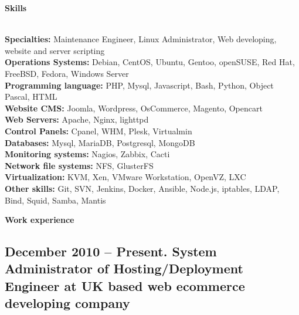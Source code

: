 \documentclass[letterpaper]{article}
\renewcommand{\section}[1]{
  {
    \large \colorbox{my-gray}{
      \begin{minipage}
        {\textwidth-0.175in}
        {\textbf{#1 \vphantom{p\^{E}}}}
      \end{minipage}
    }
  }
}
\begin{document}
\section{Skills}
\label{sec-1}\\
\label{sec-1-1}
\textbf{Specialties:} Maintenance Engineer, Linux Administrator, Web developing, website and server scripting\\
\label{sec-1-2}
\textbf{Operations Systems:} Debian, CentOS, Ubuntu, Gentoo, openSUSE, Red Hat, FreeBSD, Fedora, Windows Server\\
\label{sec-1-3}
\textbf{Programming language:} PHP, Mysql, Javascript, Bash, Python, Object Pascal, HTML\\
\label{sec-1-4}
\textbf{Website CMS:} Joomla, Wordpress, OsCommerce, Magento, Opencart\\
\label{sec-1-5}
\textbf{Web Servers:} Apache, Nginx, lighttpd\\
\label{sec-1-6}
\textbf{Control Panels:} Cpanel, WHM, Plesk, Virtualmin\\
\label{sec-1-7}
\textbf{Databases:} Mysql, MariaDB, Postgresql, MongoDB\\
\label{sec-1-8}
\textbf{Monitoring systems:} Nagios, Zabbix, Cacti\\
\label{sec-1-9}
\textbf{Network file systems:} NFS, GlusterFS\\
\label{sec-1-10}
\textbf{Virtualization:} KVM, Xen, VMware Workstation, OpenVZ, LXC\\
\label{sec-1-11}
\textbf{Other skills:} Git, SVN, Jenkins, Docker, Ansible, Node.js, iptables, LDAP, Bind, Squid, Samba, Mantis\\
\section{Work experience}
\label{sec-2}
\subsection{{December 2010 – Present}. System Administrator of Hosting/Deployment Engineer at UK based web ecommerce developing company}
\label{sec-2-1}
\end{document}
